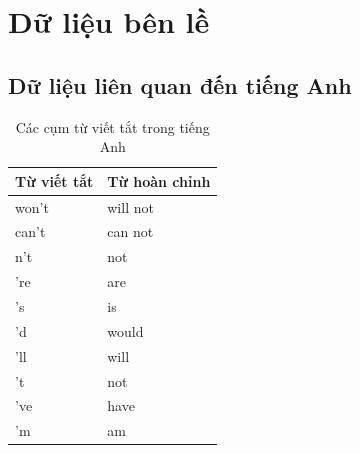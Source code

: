 \section*{Dữ liệu bên lề}
\subsection*{Dữ liệu liên quan đến tiếng Anh}
\begin{table}[htb]
    \centering
    \caption{Các cụm từ viết tắt trong tiếng Anh}
    \label{table:english-contractions}
    \begin{tabular}{ll}
        \toprule
        \textbf{Từ viết tắt} & \textbf{Từ hoàn chỉnh} \\\midrule
        won't                & will not               \\
        can't                & can not                \\
        n't                  & not                    \\
        're                  & are                    \\
        's                   & is                     \\
        'd                   & would                  \\
        'll                  & will                   \\
        't                   & not                    \\
        've                  & have                   \\
        'm                   & am                     \\
        \bottomrule
    \end{tabular}
\end{table}

